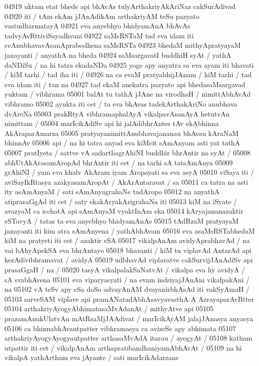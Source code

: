 04919 uktam etat bhede api bhAvAs tulyArthakriyAkAriNaz cakSurAdivad
04920 iti / tAm ekAm jJAnAdikAm arthakriyAM teSu pazyato vastudharmatayA
04921 eva anyebhyo bhidyamAnA bhAvAs tadvyAvRttiviSayadhvani 
04922 saMsRSTaM tad eva idam iti svAnubhavavAsanAprabodhena saMsRSTa  
04923 bhedaM mithyApratyayaM janayanti / anyathA na bheda 
04924 saMsargavatI buddhiH syAt / yathA daNDiSu / na hi tatra ekadaNDa  
04925 yoge apy anyatra sa eva ayam iti bhavati / kiM tarhi / tad iha iti /
04926 na ca evaM pratyabhijJAnam / kiM tarhi / tad eva idam iti / tan na 
04927 tad ekaM anekatra pazyato api bhedasaMsargavad yuktam / vibhrama 
05001 balAt tu tathA jJAne na virodhaH / nimittAbhAvAd vibhramo 
05002 ayukta iti cet / ta eva bhAvas tadekArthakAriNo anubhava dvAreNa  
05003 prakRtyA vibhramaphalAyA vikalpavAsanAyA hetutvAn nimittam /  
05004 marIcikAdiSv api hi jalAdibhrAntes tAv ekAbhinna AkAraparAmarza
05005 pratyayanimittAnubhavajananau bhAvau kAraNaM bhinnAv
05006 api / na hi tatra anyad eva kiMcit sAmAnyam asti yat tathA 
05007 pratIyeta / sattve vA sadarthagrAhiNI buddhir bhrAntir na syAt /  
05008 abhUtAkArasamAropAd bhrAntir iti cet / na tarhi sA  tatsAmAnya
05009 grAhiNI / yam eva khalv AkAram iyam Aropayati sa eva asyA  
05010 viSaya iti / aviSayIkRtasya azakyasamAropAt / AkArAntaravat / sa 
05011 ca tatra na asti ity asAmAnyaM / sati sAmAnyagrahaNe tadAropo
05012 na anyathA atiprasaGgAd iti cet / saty ekakAryakArigrahaNa iti  
05013 kiM na iSyate / avazyaM ca icchatA api sAmAnyaM vyaktInAm eka 
05014 kAryajananazaktir eSTavyA / tatas ta eva anyebhyo bhidyamAnAs 
05015 tAdRzaM pratyayaM janayanti iti kim atra sAmAnyena / yathAbhAvam  
05016 eva asaMsRSTabhedaM kiM na pratyeti iti cet / azaktir eSA
05017 vikalpAnAm avidyAprabhavAd / na vai bAhyApekSA eva bhrAntayo 
05018 bhavanti / kiM tu viplavAd AntarAd api kezAdivibhramavat / avidyA
05019 udbhavAd viplavatve cakSurvijJAnAdiSv api prasaGgaH / na /  
05020 tasyA vikalpalakSaNatvAt / vikalpa eva hy avidyA / sA svabhAvena 
05101 eva viparyasyati / na evam indriyajJAnAni vikalpakAni / na
05102 vA teSv apy eSa doSo advayAnAM dvayanirbhAsAd iti vakSyAmaH /
05103 sarveSAM viplave api pramANatadAbhAsavyavasthA A AzrayaparAvRtter
05104 arthakriyAyogyAbhimatasaMvAdanAt / mithyAtve api
05105 prazamAnukUlatvAn mAtRsaMjJAAdivat / marIcikAyAM jalajJAnasya anyasya
05106 ca bhinnabhAvautpatter vibhramasya ca avizeSe apy abhimata
05107 arthakriyAyogyAyogyautpatter arthasaMvAdA itarau / ayogyAt /  
05108 katham utpattir iti cet / vikalpAnAm arthapratibandhaniyamAbhAvAt /
05109 na hi vikalpA yathArtham eva jAyante / sati marIcikAdarzane
